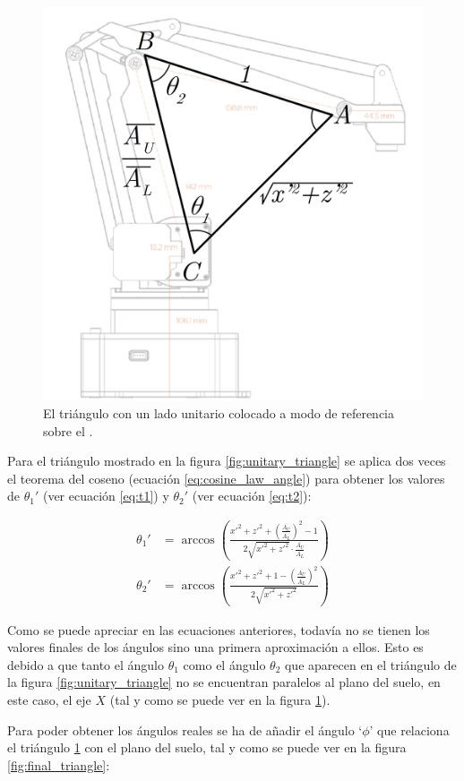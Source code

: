 \begin{figure}[H]
    \centering
    \includegraphics[width=.6\linewidth]{pictures/ik_triangle_over_arm.png}
    \caption{El triángulo con un lado unitario colocado a modo de referencia sobre el \pArm{}.}
    \label{fig:u_triangle_over_arm}
\end{figure}

Para el triángulo mostrado en la figura \ref{fig:unitary_triangle} se aplica
dos veces el teorema del coseno (ecuación \ref{eq:cosine_law_angle}) para obtener
los valores de $\theta_1'$ (ver ecuación \ref{eq:t1}) y $\theta_2'$ (ver ecuación \ref{eq:t2}):

\begin{align}
    \theta_1' & = \arccos{\left(\frac{x'^2 + z'^2 + \left(\frac{\overline{A_U}}{\overline{A_L}}\right)^2 - 1} %
    {2\sqrt{x'^2 + z'^2} \cdot \frac{\overline{A_U}}{\overline{A_L}}}\right)} \label{eq:t1}                   \\[2ex]
    \theta_2' & = \arccos{\left(\frac{x'^2 + z'^2 + 1 - \left(\frac{\overline{A_U}}{\overline{A_L}}\right)^2} %
    {2\sqrt{x'^2 + z'^2}}\right)} \label{eq:t2}
\end{align}

Como se puede apreciar en las ecuaciones anteriores, todavía no se tienen los valores finales
de los ángulos sino una primera aproximación a ellos. Esto es debido a que tanto el ángulo
$\theta_1$ como el ángulo $\theta_2$ que aparecen en el triángulo de la figura \ref{fig:unitary_triangle}
no se encuentran paralelos al plano del suelo, en este caso, el eje $X$ (tal y como se puede ver
en la figura \ref{fig:u_triangle_over_arm}).

Para poder obtener los ángulos reales se ha de añadir el ángulo `$\phi$' que relaciona el triángulo
\ref{fig:u_triangle_over_arm} con el plano del suelo, tal y como se puede ver en la figura
\ref{fig:final_triangle}:

